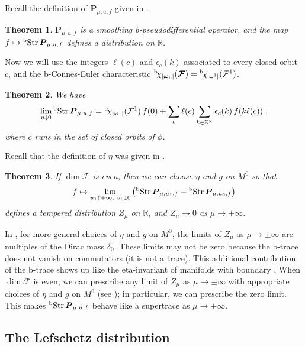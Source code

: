 \documentclass{memo-l}
\theoremstyle{plain}
\newtheorem{thm}{Theorem}[section]
\theoremstyle{definition}
\theoremstyle{remark}
\newcommand{\R}{\mathbb{R}}
\newcommand{\Z}{\mathbb{Z}}
\newcommand{\FF}{\mathcal{F}}
\newcommand{\bfP}{\boldsymbol{P}}
\newcommand{\bfFF}{\boldsymbol{\FF}}
\newcommand{\bfomega}{\boldsymbol{\omega}}
\newcommand{\Str}{\operatorname{Str}}
\newcommand{\bStr}{{}^{\text{\rm b}}\!\Str}
\newcommand{\bchi}{{}^{\text{\rm b}}\!\chi}
\numberwithin{section}{chapter}
\numberwithin{equation}{section}%
\begin{document}
Recall the definition of $\bfP_{\mu,u,f}$ given in .

\begin{thm}\label{t: intro - bfP_u f} 
$\bfP_{\mu,u,f}$ is a smoothing b-pseudodifferential operator, and the map $f\mapsto\bStr\bfP_{\mu,u,f}$ defines a distribution on $\R$.
\end{thm}  

Now we will use the integers $\ell(c)$ and $\epsilon_c(k)$ associated to every closed orbit $c$, and the b-Connes-Euler characteristic $\bchi_{|\bfomega_{\text{\rm b}}|}(\bfFF)=\bchi_{|\omega^1|}(\FF^1)$.

\begin{thm}\label{t: intro - lim_u->0 bTrs(bfP_mu u f} 
We have
\[
\lim_{u\downarrow0}\bStr\bfP_{\mu,u,f}=\bchi_{|\omega^1|}(\FF^1)\,f(0)+\sum_c\ell(c)\sum_{k\in\Z^\times}\epsilon_c(k)\,f(k\ell(c))\;,
\]
where $c$ runs in the set of closed orbits of $\phi$.
\end{thm}

Recall that the definition of $\eta$ was given in .

\begin{thm}\label{t: intro - lim_mu->pm infty ...} If $\dim\FF$ is even, then we can choose $\eta$ and $g$ on $M^0$ so that 
\[
f\mapsto\lim_{u_1\uparrow+\infty,\ u_0\downarrow0}\big(\bStr\bfP_{\mu,u_1,f}-\bStr\bfP_{\mu,u_0,f}\big)
\]
defines a tempered distribution $Z_\mu$ on $\R$, and $Z_\mu\to0$ as $\mu\to\pm\infty$.
\end{thm} 

In , for more general choices of $\eta$ and $g$ on $M^0$, the limits of $Z_\mu$ as $\mu\to\pm\infty$ are multiples of the Dirac mass $\delta_0$. These limits may not be zero because the b-trace does not vanish on commutators (it is not a trace). This additional contribution of the b-trace shows up like the eta-invariant of manifolds with boundary \cite{Melrose1993}. When $\dim\FF$ is even, we can prescribe any limit of $Z_\mu$ as $\mu\to\pm\infty$ with appropriate choices of $\eta$ and $g$ on $M^0$ \cite{AlvKordyLeichtnam-ziomf} (see ); in particular, we can prescribe the zero limit. This makes $\bStr\bfP_{\mu,u,f}$ behave like a supertrace as $\mu\to\pm\infty$. 


\subsection{The Lefschetz distribution}\label{ss: L_dis(phi)}
\end{document}
